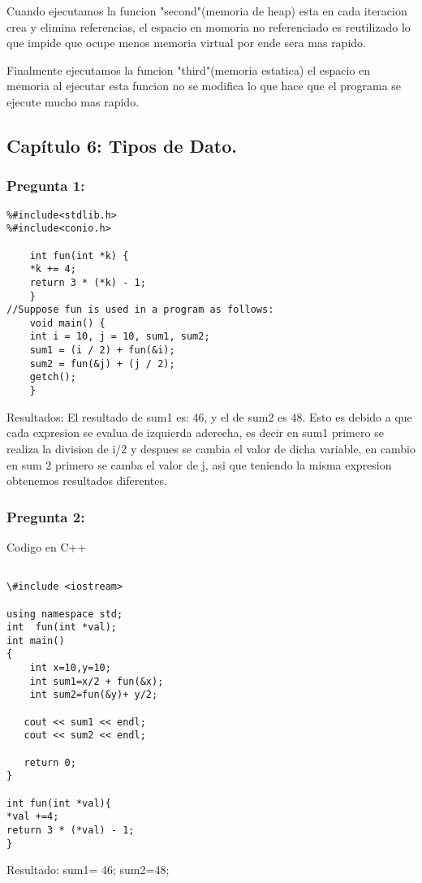 \documentclass[11pt]{article}
\begin{document}
Cuando ejecutamos la funcion "second"(memoria de heap) esta en cada iteracion crea y elimina referencias, el espacio en momoria no referenciado es reutilizado lo que impide que ocupe menos memoria virtual por ende sera mas rapido.

Finalmente ejecutamos la funcion "third"(memoria estatica) el espacio en memoria al ejecutar esta funcion no se modifica lo que hace que el programa se ejecute mucho mas rapido.


\subsection{Capítulo 6: Tipos de Dato.}
\subsubsection{Pregunta 1:}
\begin{lstlisting}[frame=single]  
%#include<stdio.h>
%#include<stdlib.h>
%#include<conio.h>

	int fun(int *k) {
	*k += 4;
	return 3 * (*k) - 1;
	}
//Suppose fun is used in a program as follows:
	void main() {
	int i = 10, j = 10, sum1, sum2;
	sum1 = (i / 2) + fun(&i);
	sum2 = fun(&j) + (j / 2);
	getch();
	}

\end{lstlisting}
Resultados:
El resultado de sum1 es: 46, y el de sum2 es 48.
Esto es debido a que cada expresion se evalua de izquierda aderecha, es decir en sum1 primero se realiza la division de i/2 y despues se cambia el valor de dicha variable, en cambio en sum 2 primero se camba el valor de j, asi que teniendo la misma expresion obtenemos resultados diferentes. 


\subsubsection{Pregunta 2:}

Codigo en C++
\begin{lstlisting}[frame=single]  % Start your code-block

\#include <iostream>

using namespace std;
int  fun(int *val); 
int main()
{
    int x=10,y=10;
    int sum1=x/2 + fun(&x);
    int sum2=fun(&y)+ y/2;
    
   cout << sum1 << endl; 
   cout << sum2 << endl; 
   
   return 0;
}

int fun(int *val){
*val +=4;
return 3 * (*val) - 1;
}

\end{lstlisting}
Resultado:
sum1= 46; sum2=48;
 
\end{document}
